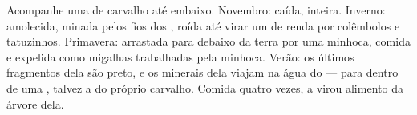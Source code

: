 \begin{example}\label{ex:g6:decomposers-and-soil:leaf}
Acompanhe uma  de carvalho até embaixo. Novembro: caída,
inteira. Inverno: amolecida, minada pelos fios dos , roída até
virar um  de renda por colêmbolos e tatuzinhos. Primavera:
arrastada para debaixo da terra por uma minhoca, comida e expelida
como migalhas trabalhadas pela minhoca. Verão: os últimos fragmentos
dela são  preto, e os minerais dela viajam na água do  ---
para dentro de uma , talvez a do próprio carvalho. Comida quatro
vezes, a  virou alimento da árvore dela.
\end{example}

